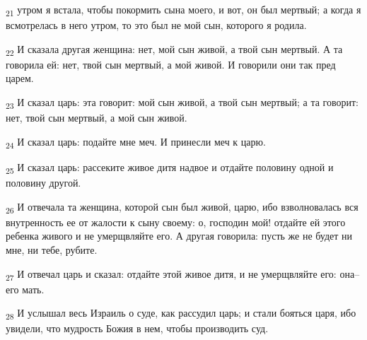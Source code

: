 \begin{tcolorbox}
\textsubscript{21} утром я встала, чтобы покормить сына моего, и вот, он был мертвый; а когда я всмотрелась в него утром, то это был не мой сын, которого я родила.
\end{tcolorbox}
\begin{tcolorbox}
\textsubscript{22} И сказала другая женщина: нет, мой сын живой, а твой сын мертвый. А та говорила ей: нет, твой сын мертвый, а мой живой. И говорили они так пред царем.
\end{tcolorbox}
\begin{tcolorbox}
\textsubscript{23} И сказал царь: эта говорит: мой сын живой, а твой сын мертвый; а та говорит: нет, твой сын мертвый, а мой сын живой.
\end{tcolorbox}
\begin{tcolorbox}
\textsubscript{24} И сказал царь: подайте мне меч. И принесли меч к царю.
\end{tcolorbox}
\begin{tcolorbox}
\textsubscript{25} И сказал царь: рассеките живое дитя надвое и отдайте половину одной и половину другой.
\end{tcolorbox}
\begin{tcolorbox}
\textsubscript{26} И отвечала та женщина, которой сын был живой, царю, ибо взволновалась вся внутренность ее от жалости к сыну своему: о, господин мой! отдайте ей этого ребенка живого и не умерщвляйте его. А другая говорила: пусть же не будет ни мне, ни тебе, рубите.
\end{tcolorbox}
\begin{tcolorbox}
\textsubscript{27} И отвечал царь и сказал: отдайте этой живое дитя, и не умерщвляйте его: она--его мать.
\end{tcolorbox}
\begin{tcolorbox}
\textsubscript{28} И услышал весь Израиль о суде, как рассудил царь; и стали бояться царя, ибо увидели, что мудрость Божия в нем, чтобы производить суд.
\end{tcolorbox}
